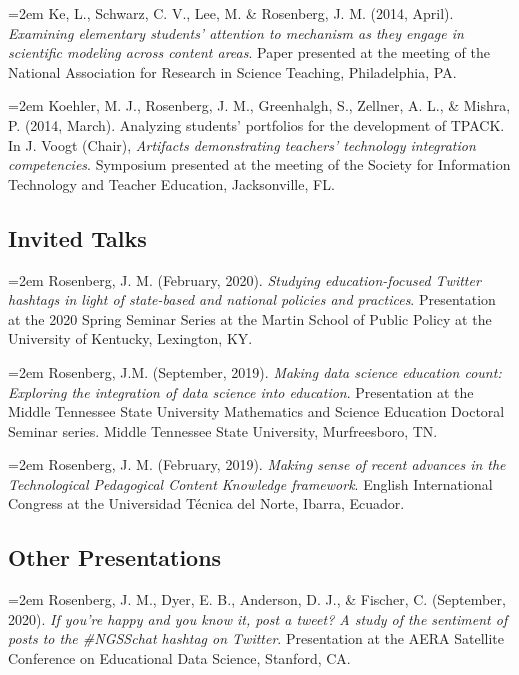 \documentclass[
  14,
]{article}
\begin{document}
\hangindent=2em Ke, L., Schwarz, C. V., Lee, M. \& Rosenberg, J. M.
(2014, April). \emph{Examining elementary students' attention to
mechanism as they engage in scientific modeling across content areas}.
Paper presented at the meeting of the National Association for Research
in Science Teaching, Philadelphia, PA.

\hangindent=2em Koehler, M. J., Rosenberg, J. M., Greenhalgh, S.,
Zellner, A. L., \& Mishra, P. (2014, March). Analyzing students'
portfolios for the development of TPACK. In J. Voogt (Chair),
\emph{Artifacts demonstrating teachers' technology integration
competencies}. Symposium presented at the meeting of the Society for
Information Technology and Teacher Education, Jacksonville, FL.

\hypertarget{invited-talks}{%
\subsection{Invited Talks}\label{invited-talks}}

\hangindent=2em Rosenberg, J. M. (February, 2020). \emph{Studying
education-focused Twitter hashtags in light of state-based and national
policies and practices}. Presentation at the 2020 Spring Seminar Series
at the Martin School of Public Policy at the University of Kentucky,
Lexington, KY.

\hangindent=2em Rosenberg, J.M. (September, 2019). \emph{Making data
science education count: Exploring the integration of data science into
education}. Presentation at the Middle Tennessee State University
Mathematics and Science Education Doctoral Seminar series. Middle
Tennessee State University, Murfreesboro, TN.

\hangindent=2em Rosenberg, J. M. (February, 2019). \emph{Making sense of
recent advances in the Technological Pedagogical Content Knowledge
framework}. English International Congress at the Universidad Técnica
del Norte, Ibarra, Ecuador.

\hypertarget{other-presentations}{%
\subsection{Other Presentations}\label{other-presentations}}

\hangindent=2em Rosenberg, J. M., Dyer, E. B., Anderson, D. J., \&
Fischer, C. (September, 2020). \emph{If you're happy and you know it,
post a tweet? A study of the sentiment of posts to the \#NGSSchat
hashtag on Twitter}. Presentation at the AERA Satellite Conference on
Educational Data Science, Stanford, CA.
\end{document}
